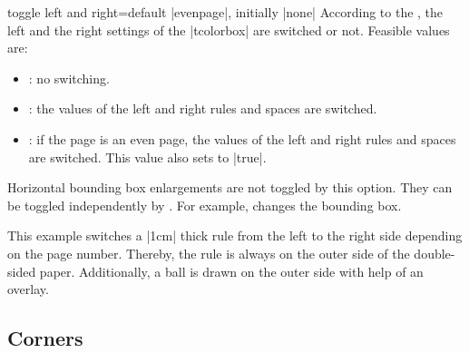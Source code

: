 {\tcbusetemp}


\clearpage
\begin{docTcbKey}[][doc updated=2015-11-13]{toggle left and right}{=}{default |evenpage|, initially |none|}
  According to the , the left and the right settings of
  the |tcolorbox| are switched or not. Feasible values are:
  \begin{itemize}
  \item{}: no switching.
  \item{}: the values of the left and right rules and spaces are switched.
  \item{}: if the page is an even page, the values of the left and
    right rules and spaces are switched. This value also sets
     to |true|.
  \end{itemize}
\begin{marker}
Horizontal bounding box enlargements are not toggled by this option.
They can be toggled independently by .
For example,  changes the bounding box.
\end{marker}
\begin{dispListing}
\begin{tcolorbox}[skin=enhancedmiddle,breakable,
  toggle left and right,
  boxrule=0mm,top=0mm,bottom=0mm,left=1mm,right=1mm,
  rightrule=1cm,colupper=blue!25!black,
  interior style={fill overzoom image=lichtspiel.jpg,fill image opacity=0.25},
  frame style={pattern=crosshatch dots light steel blue},
  overlay={%
    \tcbifoddpage{\coordinate (X) at ([xshift=-5mm]frame.east);}
                 {\coordinate (X) at ([xshift=5mm]frame.west);}
    \fill[shading=ball,ball color=blue!50!white,opacity=0.5] (X) circle (4mm);}]
\lipsum[1-6]
\end{tcolorbox}
\end{dispListing}
\medskip

This example switches a |1cm| thick rule from the left to the right side
depending on the page number. Thereby, the rule is always on the outer side
of the double-sided paper. Additionally, a ball is drawn on the outer side
with help of an overlay.
\bigskip

\tcbusetemp
\end{docTcbKey}

\clearpage
\subsection{Corners}\label{subsec:corners}

